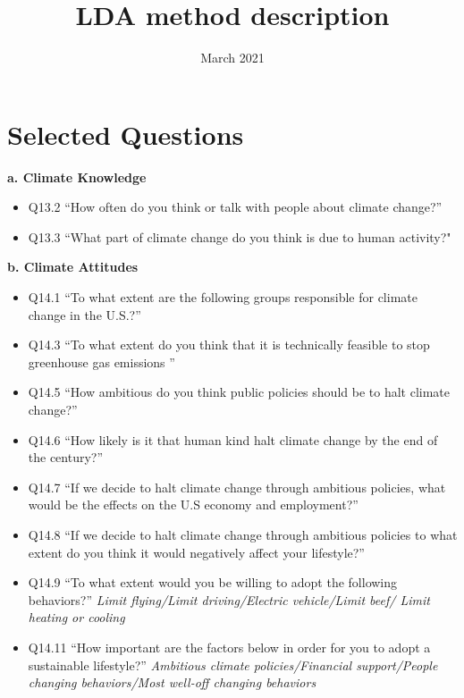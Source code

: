 \documentclass{article}
\title{LDA method description}
\date{March 2021}
\begin{document}
\maketitle

\section{Selected Questions}
\begin{flushleft}
\textbf{a. Climate Knowledge}
\end{flushleft}
\begin{itemize}
    \item Q13.2 ``How often do you think or talk with people about climate change?''
    \item Q13.3 ``What part of climate change do you think is due to human activity?"    
\end{itemize}

\begin{flushleft}
\textbf{b. Climate Attitudes}
\end{flushleft}

\begin{itemize}
    \item Q14.1 ``To what extent are the following groups responsible for climate change in the U.S.?''
    \item Q14.3 ``To what extent do you think that it is technically feasible to stop greenhouse gas emissions ''
    \item Q14.5 ``How ambitious do you think public policies should be to halt climate change?''
    \item Q14.6 ``How likely is it that human kind halt climate change by the end of the century?''
    \item Q14.7 ``If we decide to halt climate change through ambitious policies, what would be the effects on the U.S economy and employment?''
    \item Q14.8 ``If we decide to halt climate change through ambitious policies to what extent do you think it would negatively affect your lifestyle?''
    \item Q14.9 ``To what extent would you be willing to adopt the following behaviors?'' \textit{Limit flying/Limit driving/Electric vehicle/Limit beef/ Limit heating or cooling}
    \item Q14.11 ``How important are the factors below in order for you to adopt a sustainable lifestyle?'' \textit{Ambitious climate policies/Financial support/People changing behaviors/Most well-off changing behaviors}
\end{itemize}
\end{document}
